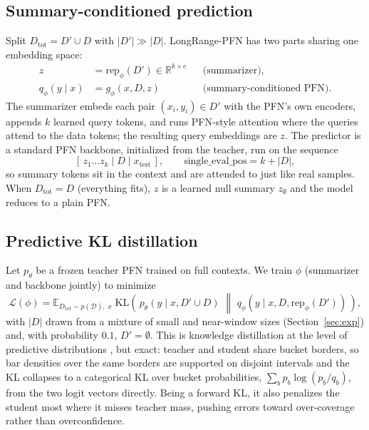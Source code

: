 \documentclass{article}
\newcommand{\Dtot}{D_{\mathrm{tot}}}
\newcommand{\Dfar}{D'}
\newcommand{\Dloc}{D}
\newcommand{\KL}[2]{\mathrm{KL}\!\left(#1 \,\middle\|\, #2\right)}
\newcommand{\rep}{\mathrm{rep}}
\begin{document}
\subsection{Summary-conditioned prediction}
\label{sec:summary}

Split $\Dtot = \Dfar \cup \Dloc$ with $|\Dfar| \gg |\Dloc|$. LongRange-PFN
has two parts sharing one embedding space:
\begin{align}
  z &= \rep_\phi(\Dfar) \in \mathbb{R}^{k \times e}
  &&\text{(summarizer)},\\
  q_\phi(y \mid x) &= g_\phi(x, \Dloc, z)
  &&\text{(summary-conditioned PFN)}.
\end{align}
The summarizer embeds each pair $(x_i, y_i) \in \Dfar$ with the PFN's own
encoders, appends $k$ learned query tokens, and runs PFN-style attention
where the queries attend to the data tokens; the resulting query embeddings
are $z$. The predictor is a standard PFN backbone, initialized from the
teacher, run on the sequence
\[
  [\, z_1 \dots z_k \mid \Dloc \mid x_{\mathrm{test}} \,],
  \qquad \text{single\_eval\_pos} = k + |\Dloc| ,
\]
so summary tokens sit in the context and are attended to just like real
samples. When $\Dtot = \Dloc$ (everything fits), $z$ is a learned null
summary $z_\emptyset$ and the model reduces to a plain PFN.

\subsection{Predictive KL distillation}
\label{sec:kl}

Let $p_\theta$ be a frozen teacher PFN trained on full contexts. We train
$\phi$ (summarizer and backbone jointly) to minimize
\begin{equation}
\label{eq:kl}
  \mathcal{L}(\phi)
  = \mathbb{E}_{\Dtot \sim p(\mathcal{D}),\; x}\;
    \KL{\,p_\theta(y \mid x, \Dfar \cup \Dloc)\,}{\,q_\phi(y \mid x, \Dloc, \rep_\phi(\Dfar))\,},
\end{equation}
with $|\Dloc|$ drawn from a mixture of small and near-window sizes
(Section~\ref{sec:exp}) and, with probability $0.1$, $\Dfar =
\emptyset$. This is knowledge distillation \citep{hinton2015distillation}
at the level of predictive distributions
\citep{korattikara2015darkknowledge, malinin2020edd}, but exact: teacher
and student share bucket borders, so bar densities over the same borders
are supported on disjoint intervals and the KL collapses to a categorical
KL over bucket probabilities, $\sum_b p_b \log(p_b/q_b)$, from the two
logit vectors directly. Being a forward KL, it also penalizes the student
most where it misses teacher mass, pushing errors toward over-coverage
rather than overconfidence.
\end{document}
